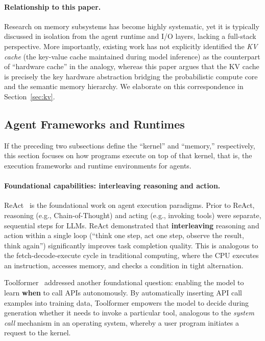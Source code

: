 \paragraph{Relationship to this paper.}
Research on memory subsystems has become highly systematic, yet it is typically discussed in isolation from the agent runtime and I/O layers, lacking a full-stack perspective.
More importantly, existing work has not explicitly identified the \textit{KV cache} (the key-value cache maintained during model inference) as the counterpart of ``hardware cache'' in the analogy, whereas this paper argues that the KV cache is precisely the key hardware abstraction bridging the probabilistic compute core and the semantic memory hierarchy.
We elaborate on this correspondence in Section~\ref{sec:kv}.

\subsection{Agent Frameworks and Runtimes}
\label{sec:related-agent-framework}

If the preceding two subsections define the ``kernel'' and ``memory,'' respectively, this section focuses on how programs execute on top of that kernel, that is, the execution frameworks and runtime environments for agents.

\paragraph{Foundational capabilities: interleaving reasoning and action.}
ReAct~\cite{yao2023react} is the foundational work on agent execution paradigms.
Prior to ReAct, reasoning (e.g., Chain-of-Thought) and acting (e.g., invoking tools) were separate, sequential steps for LLMs.
ReAct demonstrated that \textbf{interleaving} reasoning and action within a single loop (``think one step, act one step, observe the result, think again'') significantly improves task completion quality.
This is analogous to the fetch-decode-execute cycle in traditional computing, where the CPU executes an instruction, accesses memory, and checks a condition in tight alternation.

Toolformer~\cite{schick2023toolformer} addressed another foundational question: enabling the model to learn \textbf{when} to call APIs autonomously.
By automatically inserting API call examples into training data, Toolformer empowers the model to decide during generation whether it needs to invoke a particular tool, analogous to the \textit{system call} mechanism in an operating system, whereby a user program initiates a request to the kernel.

